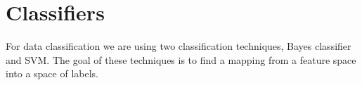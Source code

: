 \chapter{Classifiers}
For data classification we are using two classification techniques, Bayes classifier and SVM. The goal of these techniques is to find a mapping from a feature space into a space of labels.


